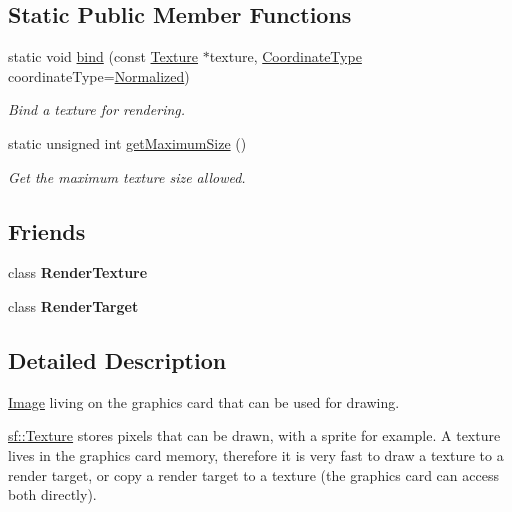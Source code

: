 \subsection*{Static Public Member Functions}
\begin{DoxyCompactItemize}
\item 
static void \hyperlink{classsf_1_1Texture_ae9a4274e7b95ebf7244d09c7445833b0}{bind} (const \hyperlink{classsf_1_1Texture}{Texture} $\ast$texture, \hyperlink{classsf_1_1Texture_aa6fd3bbe3c334b3c4428edfb2765a82e}{Coordinate\-Type} coordinate\-Type=\hyperlink{classsf_1_1Texture_aa6fd3bbe3c334b3c4428edfb2765a82ea69d6228950882e4d68be4ba4dbe7df73}{Normalized})
\begin{DoxyCompactList}\small\item\em Bind a texture for rendering. \end{DoxyCompactList}\item 
static unsigned int \hyperlink{classsf_1_1Texture_a0bf905d487b104b758549c2e9e20a3fb}{get\-Maximum\-Size} ()
\begin{DoxyCompactList}\small\item\em Get the maximum texture size allowed. \end{DoxyCompactList}\end{DoxyCompactItemize}
\subsection*{Friends}
\begin{DoxyCompactItemize}
\item 
\hypertarget{classsf_1_1Texture_a2548fc9744f5e43e0276d5627ca178de}{class {\bfseries Render\-Texture}}\label{classsf_1_1Texture_a2548fc9744f5e43e0276d5627ca178de}

\item 
\hypertarget{classsf_1_1Texture_aa5afc6f82b7b587ed5ada4d227ce32aa}{class {\bfseries Render\-Target}}\label{classsf_1_1Texture_aa5afc6f82b7b587ed5ada4d227ce32aa}

\end{DoxyCompactItemize}


\subsection{Detailed Description}
\hyperlink{classsf_1_1Image}{Image} living on the graphics card that can be used for drawing. 

\hyperlink{classsf_1_1Texture}{sf\-::\-Texture} stores pixels that can be drawn, with a sprite for example. A texture lives in the graphics card memory, therefore it is very fast to draw a texture to a render target, or copy a render target to a texture (the graphics card can access both directly).

